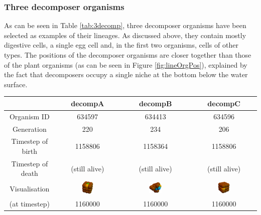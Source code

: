 \subsubsection{Three decomposer organisms}\label{subsubsec:3decomp}
As can be seen in Table \ref{tab:3decomp}, three decomposer organisms have been selected as examples of their lineages. As discussed above, they contain mostly digestive cells, a single egg cell and, in the first two organisms, cells of other types. The positions of the decomposer organisms are closer together than those of the plant organisms (as can be seen in Figure \ref{fig:lineOrgPos}), explained by the fact that decomposers occupy a single niche at the bottom below the water surface.
\begin{table}[H]
 \begin{tabular}{ c || c | c | c |} 
    & decompA & decompB & decompC \\ [0.5ex] \hline \hline
     Organism ID & 634597 & 634413 & 634596 \\ \hline
     Generation & 220 & 234 & 206 \\ \hline
     Timestep of birth & 1158806 & 1158364 & 1158806 \\ \hline
     Timestep of death & (still alive) & (still alive) & (still alive) \\ \hline
     Visualisation & 
        \includegraphics[width=0.2\textwidth]{figure/3orgs/decompA} &
        \includegraphics[width=0.2\textwidth]{figure/3orgs/decompB} &
        \includegraphics[width=0.2\textwidth]{figure/3orgs/decompC} \\
     (at timestep) & 1160000 & 1160000 & 1160000 \\ \hline

\end{tabular}
\end{table}

